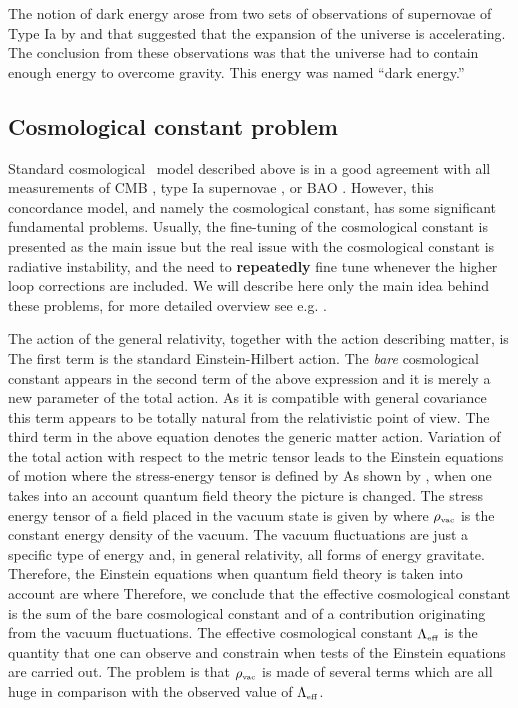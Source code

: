 The notion of dark energy arose from two sets of observations of supernovae of Type Ia by \textcite{riess} and \textcite{1999ApJ...517..565P} that suggested that the expansion of the universe is accelerating. The conclusion from these observations was that the universe had to contain enough energy to overcome gravity. This energy was named “dark energy.”

\subsection{Cosmological constant problem}
Standard cosmological \LCDM\ model described above is in a good agreement with all measurements of CMB \parencite{planck_cosm}, type Ia supernovae \parencite{Abbott_2019}, or BAO \parencite{BAO_results}. However, this concordance model, and namely the cosmological constant, has some significant fundamental problems. Usually, the fine-tuning of the cosmological constant is presented as the main issue but the real issue with the cosmological constant is radiative instability, and the need to \textbf{repeatedly} fine tune whenever the higher loop corrections are included. We will describe here only the main idea behind these problems, for more detailed overview see e.g. \textcite{2015arXiv150205296P,2012CRPhy..13..566M}.

The action of the general relativity, together with the action describing matter, is
The first term is the standard Einstein-Hilbert action. The \textit{bare} cosmological constant appears in the second term of the above expression and it is merely a new parameter of the total action. As it is compatible with general covariance this term appears to be totally natural from the relativistic point of view. The third term in the above equation denotes the generic matter action. Variation of the total action with respect to the metric tensor leads to the Einstein equations of motion
where the stress-energy tensor is defined by
As shown by \textcite{1968SPhD...12.1040S}, when one takes into an account quantum field theory the picture is changed. The stress energy tensor of a field placed in the vacuum state is given by
where $\rho_\text{\tiny vac}$ is the constant energy density of the vacuum. The vacuum fluctuations are just a specific type of energy and, in general relativity, all forms of energy gravitate. Therefore, the Einstein equations when quantum field theory is taken into account are
where
Therefore, we conclude that the effective cosmological constant is the sum of the bare cosmological constant and of a contribution originating from the vacuum fluctuations. The effective cosmological constant $\Lambda_\text{\tiny eff}$ is the quantity that one can observe and constrain when tests of the Einstein equations are carried out. The problem is that $\rho_\text{\tiny vac}$ is made of several terms which are all huge in comparison with the observed value of $\Lambda_\text{\tiny eff}$.

